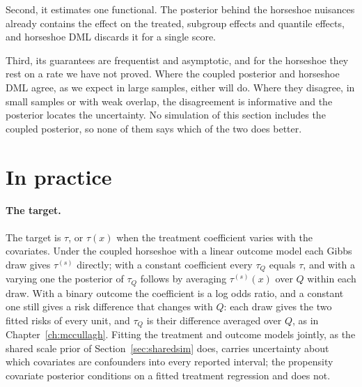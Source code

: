 Second, it estimates one functional. The posterior behind the horseshoe nuisances already contains the effect on the treated, subgroup effects and quantile effects, and horseshoe DML discards it for a single score.

Third, its guarantees are frequentist and asymptotic, and for the horseshoe they rest on a rate we have not proved. Where the coupled posterior and horseshoe DML agree, as we expect in large samples, either will do. Where they disagree, in small samples or with weak overlap, the disagreement is informative and the posterior locates the uncertainty. No simulation of this section includes the coupled posterior, so none of them says which of the two does better.

\section{In practice}

\paragraph{The target.} The target is $\tau$, or $\tau(x)$ when the treatment coefficient varies with the covariates. Under the coupled horseshoe with a linear outcome model each Gibbs draw gives $\tau^{(s)}$ directly; with a constant coefficient every $\tau_Q$ equals $\tau$, and with a varying one the posterior of $\tau_Q$ follows by averaging $\tau^{(s)}(x)$ over $Q$ within each draw. With a binary outcome the coefficient is a log odds ratio, and a constant one still gives a risk difference that changes with $Q$: each draw gives the two fitted risks of every unit, and $\tau_Q$ is their difference averaged over $Q$, as in Chapter~\ref{ch:mccullagh}. Fitting the treatment and outcome models jointly, as the shared scale prior of Section~\ref{sec:sharedsim} does, carries uncertainty about which covariates are confounders into every reported interval; the propensity covariate posterior conditions on a fitted treatment regression and does not.

